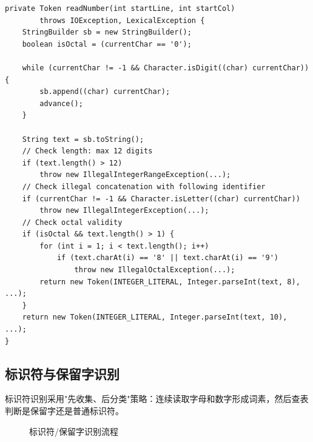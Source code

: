 \documentclass[12pt,a4paper,fontset=none]{ctexart}
\begin{document}
\begin{lstlisting}[style=javacode,caption={OberonScanner.readNumber() 核心逻辑}]
private Token readNumber(int startLine, int startCol)
        throws IOException, LexicalException {
    StringBuilder sb = new StringBuilder();
    boolean isOctal = (currentChar == '0');

    while (currentChar != -1 && Character.isDigit((char) currentChar)) {
        sb.append((char) currentChar);
        advance();
    }

    String text = sb.toString();
    // Check length: max 12 digits
    if (text.length() > 12)
        throw new IllegalIntegerRangeException(...);
    // Check illegal concatenation with following identifier
    if (currentChar != -1 && Character.isLetter((char) currentChar))
        throw new IllegalIntegerException(...);
    // Check octal validity
    if (isOctal && text.length() > 1) {
        for (int i = 1; i < text.length(); i++)
            if (text.charAt(i) == '8' || text.charAt(i) == '9')
                throw new IllegalOctalException(...);
        return new Token(INTEGER_LITERAL, Integer.parseInt(text, 8), ...);
    }
    return new Token(INTEGER_LITERAL, Integer.parseInt(text, 10), ...);
}
\end{lstlisting}

\subsection{标识符与保留字识别}

标识符识别采用"先收集、后分类"策略：连续读取字母和数字形成词素，然后查表判断是保留字还是普通标识符。

\begin{figure}[H]\centering
{}
\caption{标识符/保留字识别流程}
\label{fig:ident}
\end{figure}
\end{document}
